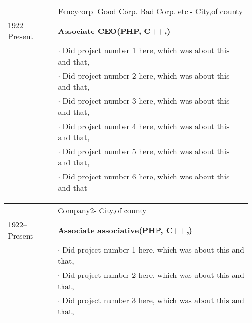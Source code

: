 \documentclass[11pt,english]{article}
\begin{document}
\begin{minipage}{\textwidth}


  
    \begin{tabular}{ @{} p{32mm} p{135mm} @{} }
    & \small Fancycorp, Good Corp. Bad Corp. etc.\small \hspace{1mm}- City,of county\\
    \small 1922--Present & \bf\small Associate CEO\small\hspace{1mm}\bf\color{maincolor}(PHP, C++,)\\
        & $\cdot$ \small Did project number 1 here, which was about this and that, \\
      
        & $\cdot$ \small Did project number 2 here, which was about this and that, \\
      
        & $\cdot$ \small Did project number 3 here, which was about this and that, \\
      
        & $\cdot$ \small Did project number 4 here, which was about this and that, \\
      
        & $\cdot$ \small Did project number 5 here, which was about this and that, \\
      
        & $\cdot$ \small Did project number 6 here, which was about this and that \\
      \end{tabular}
    \vspace{2mm}
  
    \begin{tabular}{ @{} p{32mm} p{135mm} @{} }
    & \small Company2\small \hspace{1mm}- City,of county\\
    \small 1922--Present & \bf\small Associate associative\small\hspace{1mm}\bf\color{maincolor}(PHP, C++,)\\
        & $\cdot$ \small Did project number 1 here, which was about this and that, \\
      
        & $\cdot$ \small Did project number 2 here, which was about this and that, \\
      
        & $\cdot$ \small Did project number 3 here, which was about this and that, \\
      

\end{tabular}
\end{minipage}
\end{document}
